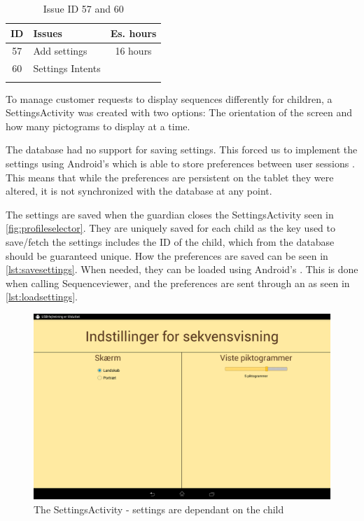 \begin{longtable} { | c | p{12cm} | c | } 
\hline
	ID 	&	Issues	&		 Es. hours \\\hline
	57	&	Add settings	&	16 hours	\\\hline
	60	&	Settings Intents & \\\hline
\caption{Issue ID 57 and 60}
\label{tab:spr4_addsettings}
\end{longtable}

To manage customer requests to display sequences differently for children, a SettingsActivity was created with two options: The orientation of the screen and how many pictograms to display at a time.

The database had no support for saving settings. This forced us to implement the settings using Android's  which is able to store preferences between user sessions \cite{sharedpreferences}. This means that while the preferences are persistent on the tablet they were altered, it is not synchronized with the database at any point.

The settings are saved when the guardian closes the SettingsActivity seen in \ref{fig:profileselector}. They are uniquely saved for each child as the key used to save/fetch the settings includes the ID of the child, which from the database should be guaranteed unique. How the preferences are saved can be seen in \ref{lst:savesettings}. When needed, they can be loaded using Android's . This is done when calling Sequenceviewer, and the preferences are sent through an  as seen in \ref{lst:loadsettings}.

\begin{figure}[H]
	\centering
	\includegraphics[width=\textwidth]{Pics/Sprint4/settings.png}
	\caption{The SettingsActivity - settings are dependant on the child}
	\label{fig:settingsactivity}
\end{figure}

